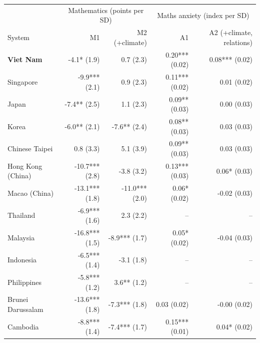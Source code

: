 \begin{tabular}{@{}lrrrr@{}}
\toprule
 & \multicolumn{2}{c}{Mathematics (points per SD)} & \multicolumn{2}{c}{Maths anxiety (index per SD)} \\
System & M1 & M2 (+climate) & A1 & A2 (+climate, relations) \\
\midrule
\textbf{Viet Nam} & -4.1* (1.9) & 0.7 (2.3) & 0.20*** (0.02) & 0.08*** (0.02) \\
Singapore & -9.9*** (2.1) & 0.9 (2.3) & 0.11*** (0.02) & 0.01 (0.02) \\
Japan & -7.4** (2.5) & 1.1 (2.3) & 0.09** (0.03) & 0.00 (0.03) \\
Korea & -6.0** (2.1) & -7.6** (2.4) & 0.08** (0.03) & 0.03 (0.03) \\
Chinese Taipei & 0.8 (3.3) & 5.1 (3.9) & 0.09** (0.03) & 0.03 (0.03) \\
Hong Kong (China) & -10.7*** (2.8) & -3.8 (3.2) & 0.13*** (0.03) & 0.06* (0.03) \\
Macao (China) & -13.1*** (1.8) & -11.0*** (2.0) & 0.06* (0.02) & -0.02 (0.03) \\
Thailand & -6.9*** (1.6) & 2.3 (2.2) & -- & -- \\
Malaysia & -16.8*** (1.5) & -8.9*** (1.7) & 0.05* (0.02) & -0.04 (0.03) \\
Indonesia & -6.5*** (1.4) & -3.1 (1.8) & -- & -- \\
Philippines & -5.8*** (1.2) & 3.6** (1.2) & -- & -- \\
Brunei Darussalam & -13.6*** (1.8) & -7.3*** (1.8) & 0.03 (0.02) & -0.00 (0.02) \\
Cambodia & -8.8*** (1.4) & -7.4*** (1.7) & 0.15*** (0.01) & 0.04* (0.02) \\
\bottomrule
\end{tabular}

